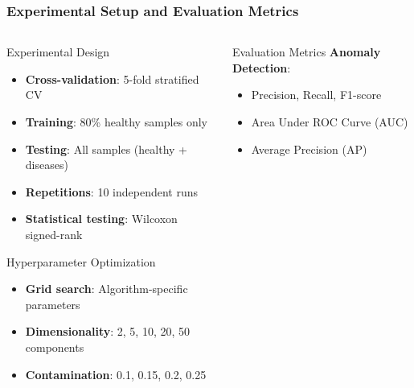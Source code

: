 \documentclass[aspectratio=43]{beamer}
\begin{document}
\begin{frame}
    \frametitle{Experimental Setup and Evaluation Metrics}
    
    \begin{columns}
        \begin{column}{0.5\textwidth}
            \begin{block}{Experimental Design}
                \begin{itemize}
                    \item \textbf{Cross-validation}: 5-fold stratified CV
                    \item \textbf{Training}: 80\% healthy samples only
                    \item \textbf{Testing}: All samples (healthy + diseases)
                    \item \textbf{Repetitions}: 10 independent runs
                    \item \textbf{Statistical testing}: Wilcoxon signed-rank
                \end{itemize}
            \end{block}
            
            \begin{exampleblock}{Hyperparameter Optimization}
                \begin{itemize}
                    \item \textbf{Grid search}: Algorithm-specific parameters
                    \item \textbf{Dimensionality}: 2, 5, 10, 20, 50 components
                    \item \textbf{Contamination}: 0.1, 0.15, 0.2, 0.25
                \end{itemize}
            \end{exampleblock}
        \end{column}
        
        \begin{column}{0.5\textwidth}
            \begin{block}{Evaluation Metrics}
                \textbf{Anomaly Detection}:
                \begin{itemize}
                    \item Precision, Recall, F1-score
                    \item Area Under ROC Curve (AUC)
                    \item Average Precision (AP)
                \end{itemize}
                

\end{block}
\end{column}
\end{columns}
\end{frame}
\end{document}
